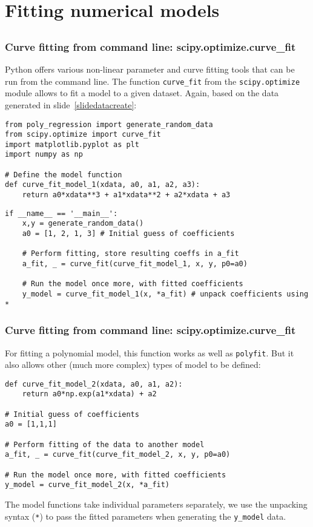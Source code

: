 \section{Fitting numerical models}
\subsection*{}

{\nologo
\begin{frame}[fragile]
  \frametitle{Curve fitting from command line: scipy.optimize.curve\_fit}
  Python offers various non-linear parameter and curve fitting tools that can be run from the command line. The function \lstinline$curve_fit$ from the \lstinline$scipy.optimize$ module allows to fit a model to a given dataset. Again, based on the data generated in slide~\ref{slidedatacreate}:
    \begin{lstlisting}
from poly_regression import generate_random_data
from scipy.optimize import curve_fit
import matplotlib.pyplot as plt
import numpy as np

# Define the model function
def curve_fit_model_1(xdata, a0, a1, a2, a3):
    return a0*xdata**3 + a1*xdata**2 + a2*xdata + a3
    \end{lstlisting}
    \begin{lstlisting}
if __name__ == '__main__':
    x,y = generate_random_data()
    a0 = [1, 2, 1, 3] # Initial guess of coefficients
    
    # Perform fitting, store resulting coeffs in a_fit
    a_fit, _ = curve_fit(curve_fit_model_1, x, y, p0=a0)
    
    # Run the model once more, with fitted coefficients
    y_model = curve_fit_model_1(x, *a_fit) # unpack coefficients using *
    \end{lstlisting}
\end{frame}
}

\begin{frame}[fragile]
  \frametitle{Curve fitting from command line: scipy.optimize.curve\_fit}
  For fitting a polynomial model, this function works as well as \lstinline|polyfit|. But it also allows other (much more complex) types of model to be defined:
    \begin{lstlisting}
def curve_fit_model_2(xdata, a0, a1, a2):
    return a0*np.exp(a1*xdata) + a2

# Initial guess of coefficients
a0 = [1,1,1]

# Perform fitting of the data to another model
a_fit, _ = curve_fit(curve_fit_model_2, x, y, p0=a0)

# Run the model once more, with fitted coefficients
y_model = curve_fit_model_2(x, *a_fit)
    \end{lstlisting}
    The model functions take individual parameters separately, we use the unpacking syntax (\lstinline$*$) to pass the fitted parameters when generating the \lstinline$y_model$ data.
\end{frame}

